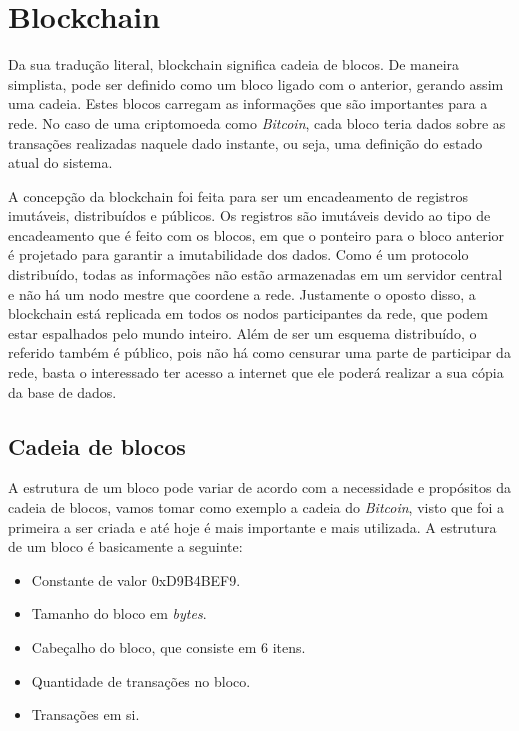 \documentclass{ufsctex/ufsctex}
\begin{document}
\section{Blockchain}

Da sua tradução literal, blockchain significa cadeia de blocos. De  maneira
simplista, pode ser definido como um bloco ligado com o anterior, gerando assim
uma cadeia. Estes blocos carregam as informações que são importantes para a
rede. No caso de uma criptomoeda como \textit{Bitcoin}, cada bloco teria dados
sobre as transações realizadas naquele dado instante, ou seja, uma definição do
estado atual do sistema.

A concepção da blockchain foi feita para ser um encadeamento de registros
imutáveis, distribuídos e públicos. Os registros são imutáveis devido ao tipo de
encadeamento que é feito com os blocos, em que o ponteiro para o bloco anterior
é projetado para garantir a imutabilidade dos dados. Como é um protocolo
distribuído, todas as informações não estão armazenadas em um servidor central e
não há um nodo mestre que coordene a rede. Justamente o oposto disso, a
blockchain está replicada em todos os nodos participantes da rede, que podem
estar espalhados pelo mundo inteiro. Além de ser um esquema distribuído, o
referido também é público, pois não há como censurar uma parte de participar da
rede, basta o interessado ter acesso a internet que ele poderá realizar a sua
cópia da base de dados.\cite{blockchain}

\subsection{Cadeia de blocos}
A estrutura de um bloco pode variar de acordo com a necessidade e propósitos da
cadeia de blocos, vamos tomar como exemplo a cadeia do \textit{Bitcoin}, visto
que foi a primeira a ser criada e até hoje é mais importante e mais utilizada.
A estrutura de um bloco é basicamente a seguinte:

\begin{itemize}
	\item Constante de valor 0xD9B4BEF9.
	\item Tamanho do bloco em \textit{bytes}.
	\item Cabeçalho do bloco, que consiste em 6 itens.
	\item Quantidade de transações no bloco.
	\item Transações em si.
\end{itemize}
\end{document}
